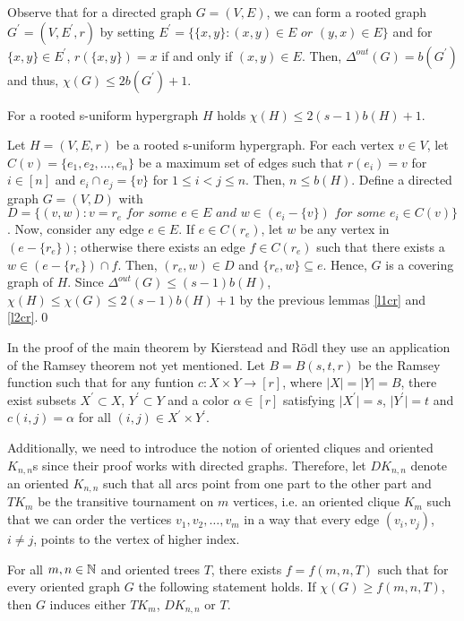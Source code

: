 Observe that for a directed graph $G=(V,E)$, we can form a rooted graph $G^\prime =(V,E^\prime ,r)$ by setting $E^\prime =\{\{ x,y\} :(x,y)\in E \textit{ or } (y,x)\in E\}$ and for $\{ x,y\}\in E^\prime$, $r(\{ x,y\} )=x$ if and only if $(x,y)\in E$. Then, $\Delta^{out}(G)=b(G^\prime )$ and thus, $\chi (G)\leq 2b(G^\prime ) +1$.

\begin{lemma}\label{l3cr}
For a rooted s-uniform hypergraph $H$ holds $\chi (H)\leq 2(s-1)b(H) +1$.
\end{lemma}
\begin{prf}
Let $H=(V,E,r)$ be a rooted s-uniform hypergraph. For each vertex $v\in V$, let $C(v)=\{ e_1,e_2,\dots ,e_n\}$ be a maximum set of edges such that $r(e_i)=v$ for $i\in [n]$ and $e_i\cap e_j = \{ v\}$ for $1\leq i<j\leq n$. Then, $n\leq b(H)$. Define a directed graph $G=(V,D)$ with $D=\{(v,w): v =r_e \textit{ for some } e\in E\textit{ and } w\in (e_i -\{v\}) \textit{ for some } e_i\in C(v)\}$. Now, consider any edge $e\in E$. If $e\in C(r_e)$, let $w$ be any vertex in $(e-\{ r_e\})$; otherwise there exists an edge $f\in C(r_e)$ such that there exists a $w\in (e-\{ r_e\})\cap f$. Then, $(r_e,w)\in D$ and $\{r_e,w\}\subseteq e$. Hence, $G$ is a covering graph of $H$. Since $\Delta^{out}(G)\leq (s-1)b(H)$, $\chi (H)\leq\chi (G)\leq 2(s-1)b(H) +1$ by the previous lemmas \ref{l1cr} and \ref{l2cr}.\qed
\end{prf}

In the proof of the main theorem by Kierstead and Rödl they use an application of the Ramsey theorem not yet mentioned. Let $B=B(s,t,r)$ be the Ramsey function such that for any funtion $c:X\times Y\to [r]$, where $\vert X\vert =\vert Y\vert = B$, there exist subsets $X^\prime\subset X$, $Y^\prime\subset Y$ and a color $\alpha\in [r]$ satisfying $\vert X^\prime\vert = s$, $\vert Y^\prime\vert =t$ and $c(i,j) =\alpha$ for all $(i,j)\in X^\prime\times Y^\prime$. 

Additionally, we need to introduce the notion of oriented cliques and oriented $K_{n,n}$s since their proof works with directed graphs. Therefore, let $DK_{n,n}$ denote an oriented $K_{n,n}$ such that all arcs point from one part to the other part and $TK_m$ be the transitive tournament on $m$ vertices, i.e. an oriented clique $K_m$ such that we can order the vertices $v_1, v_2, \dots ,v_m$ in a way that every edge $(v_i,v_j)$, $i\neq j$, points to the vertex of higher index.

\begin{thm}\label{t2cr}
For all $m,n\in\mathbb{N}$ and oriented trees $T$, there exists $f=f(m,n,T)$ such that for every oriented graph $G$ the following statement holds. If $\chi (G)\geq f(m,n,T)$, then $G$ induces either $TK_m$, $DK_{n,n}$ or $T$.
\end{thm}

